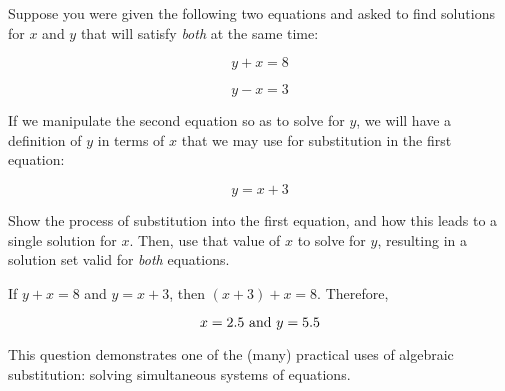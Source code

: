 

Suppose you were given the following two equations and asked to find solutions for $x$ and $y$ that will satisfy {\it both} at the same time:

$$y + x = 8$$

$$y - x = 3$$

If we manipulate the second equation so as to solve for $y$, we will have a definition of $y$ in terms of $x$ that we may use for substitution in the first equation:

$$y = x + 3$$

Show the process of substitution into the first equation, and how this leads to a single solution for $x$.  Then, use that value of $x$ to solve for $y$, resulting in a solution set valid for {\it both} equations.







If $y + x = 8$ and $y = x + 3$, then $(x + 3) + x = 8$.  Therefore, 

$$x = 2.5 \hbox{ and } y = 5.5$$







This question demonstrates one of the (many) practical uses of algebraic substitution: solving simultaneous systems of equations.




